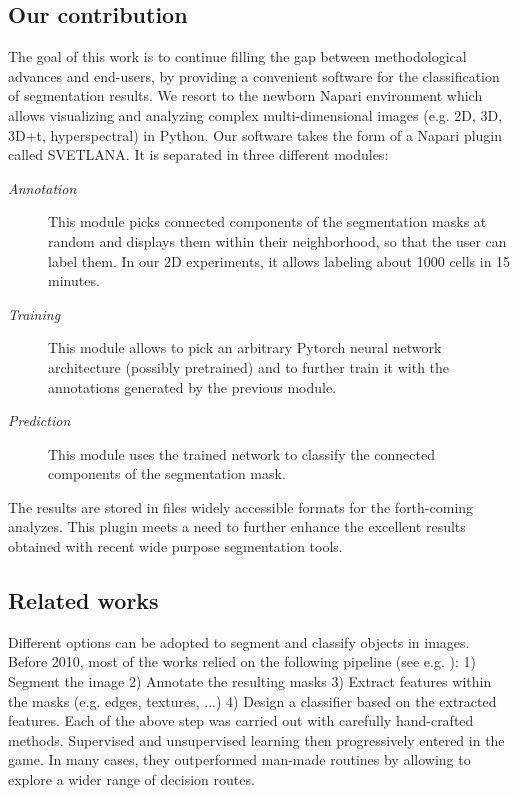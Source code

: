 \documentclass{article}
\begin{document}
\subsection{Our contribution}

The goal of this work is to continue filling the gap between methodological advances and end-users, by providing a convenient software for the classification of segmentation results. 
We resort to the newborn Napari environment \cite{perkel2021python} which allows visualizing and analyzing complex multi-dimensional images (e.g. 2D, 3D, 3D+t, hyperspectral) in Python.
Our software takes the form of a Napari plugin called SVETLANA. 
It is separated in three different modules: 
\begin{description}
  \item[\emph{Annotation}] This module picks connected components of the segmentation masks at random and displays them within their neighborhood, so that the user can label them. In our 2D experiments, it allows labeling about 1000 cells in 15 minutes.
  \item[\emph{Training}] This module allows to pick an arbitrary Pytorch \cite{paszke2019pytorch} neural network architecture (possibly pretrained) and to further train it with the annotations generated by the previous module.
  \item[\emph{Prediction}] This module uses the trained network to classify the connected components of the segmentation mask.
\end{description}
The results are stored in files widely accessible formats for the forth-coming analyzes. This plugin meets a need to further enhance the excellent results obtained with recent wide purpose segmentation tools.

\subsection{Related works}

Different options can be adopted to segment and classify objects in images. 
Before 2010, most of the works relied on the following pipeline (see e.g. \cite{irshad2013methods}): 1) Segment the image 2) Annotate the resulting masks 3) Extract features within the masks (e.g. edges, textures, ...) 4) Design a classifier based on the extracted features. 
Each of the above step was carried out with carefully hand-crafted methods. 
Supervised and unsupervised learning then progressively entered in the game. 
In many cases, they outperformed man-made routines by allowing to explore a wider range of decision routes. 
\end{document}

